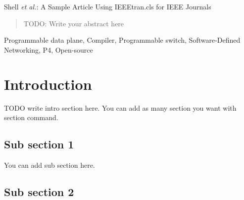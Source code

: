 %
{Shell \MakeLowercase{\textit{et al.}}: A Sample Article Using IEEEtran.cls for IEEE Journals}


\maketitle

\begin{abstract}
  
TODO: Write your abstract here

  
\end{abstract}

\begin{IEEEkeywords}
  Programmable data plane, Compiler, Programmable switch,  Software-Defined Networking, 
   P4,   Open-source
  \end{IEEEkeywords}

\maketitle


\section{Introduction}
TODO write intro section here. You can add as many section you want with \\section command. 



\subsection{Sub section 1}\label{Subsection1}

You can add sub section here. 


\subsection{Sub section 2}\label{Subsection2}

